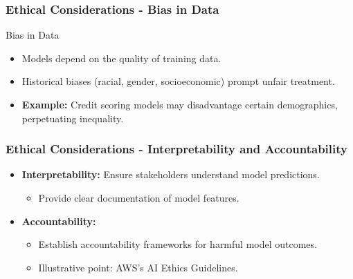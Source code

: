 \documentclass[aspectratio=169]{beamer}
\begin{document}
\begin{frame}[fragile]
    \frametitle{Ethical Considerations - Bias in Data}
    \begin{block}{Bias in Data}
        \begin{itemize}
            \item Models depend on the quality of training data.
            \item Historical biases (racial, gender, socioeconomic) prompt unfair treatment.
            \item \textbf{Example:} Credit scoring models may disadvantage certain demographics, perpetuating inequality.
        \end{itemize}
    \end{block}
\end{frame}

\begin{frame}[fragile]
    \frametitle{Ethical Considerations - Interpretability and Accountability}
    \begin{itemize}
        \item \textbf{Interpretability:} Ensure stakeholders understand model predictions.
            \begin{itemize}
                \item Provide clear documentation of model features.
            \end{itemize}
        \item \textbf{Accountability:}
            \begin{itemize}
                \item Establish accountability frameworks for harmful model outcomes.
                \item Illustrative point: AWS's AI Ethics Guidelines.
            \end{itemize}
    \end{itemize}
\end{frame}
\end{document}
